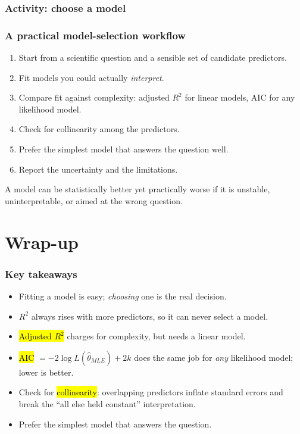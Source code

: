 \documentclass[slidestop,compress,mathserif]{beamer}
\begin{document}
\begin{frame}
\frametitle{Activity: choose a model}
\end{frame}
\begin{frame}
\frametitle{A practical model-selection workflow}

\begin{enumerate}
\item Start from a scientific question and a sensible set of candidate predictors.
\item Fit models you could actually \emph{interpret}.
\item Compare fit against complexity: adjusted $R^2$ for linear models, AIC for any likelihood model.
\item Check for collinearity among the predictors.
\item Prefer the simplest model that answers the question well.
\item Report the uncertainty and the limitations.
\end{enumerate}

\vspace{0.4em}
A model can be statistically better yet practically worse if it is unstable, uninterpretable, or aimed at the wrong question.

\end{frame}
\section{Wrap-up}
\begin{frame}
\frametitle{Key takeaways}

\begin{itemize}
\item Fitting a model is easy; \emph{choosing} one is the real decision.
\item $R^2$ always rises with more predictors, so it can never select a model.
\item \hl{Adjusted $R^2$} charges for complexity, but needs a linear model.
\item \hl{AIC} $=-2\log L(\hat\theta_{MLE})+2k$ does the same job for \emph{any} likelihood model; lower is better.
\item Check for \hl{collinearity}: overlapping predictors inflate standard errors and break the ``all else held constant'' interpretation.
\item Prefer the simplest model that answers the question.
\end{itemize}

\end{frame}

\end{document}
